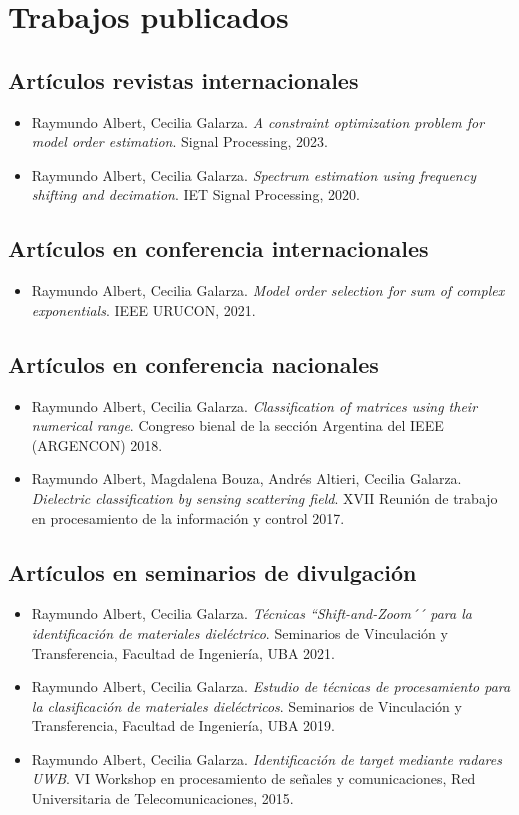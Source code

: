 \section{Trabajos publicados}

\subsection*{Artículos revistas internacionales}
\begin{itemize}
	\item Raymundo Albert, Cecilia Galarza. \textit{A constraint optimization problem for model order estimation}. Signal Processing, 2023.
	\item Raymundo Albert, Cecilia Galarza. \textit{Spectrum estimation using frequency shifting and decimation}. IET Signal Processing, 2020.
\end{itemize}
\subsection*{Artículos en conferencia internacionales}
\begin{itemize}
	\item Raymundo Albert, Cecilia Galarza. \textit{Model order selection for sum of complex exponentials}. IEEE URUCON, 2021.
\end{itemize}
\subsection*{Artículos en conferencia nacionales}
\begin{itemize}
	\item Raymundo Albert, Cecilia Galarza. \textit{Classification of matrices using their numerical range}. Congreso bienal de la sección Argentina del IEEE (ARGENCON) 2018.
	\item Raymundo Albert, Magdalena Bouza, Andrés Altieri, Cecilia Galarza. \textit{Dielectric classification by sensing scattering field}. XVII Reunión de trabajo en procesamiento de la información y control 2017.
\end{itemize}
\subsection*{Artículos en seminarios de divulgación}
\begin{itemize}
	\item Raymundo Albert, Cecilia Galarza. \textit{Técnicas ``Shift-and-Zoom´´ para la identificación de materiales dieléctrico}. Seminarios de Vinculación y Transferencia, Facultad de Ingeniería, UBA 2021.
	\item  Raymundo Albert, Cecilia Galarza. \textit{Estudio de técnicas de procesamiento para la clasificación de materiales dieléctricos}. Seminarios de Vinculación y Transferencia, Facultad de Ingeniería, UBA 2019.
	\item Raymundo Albert, Cecilia Galarza. \textit{Identificación de target mediante radares UWB}. VI Workshop en procesamiento de señales y comunicaciones, Red Universitaria de Telecomunicaciones, 2015.
\end{itemize}




